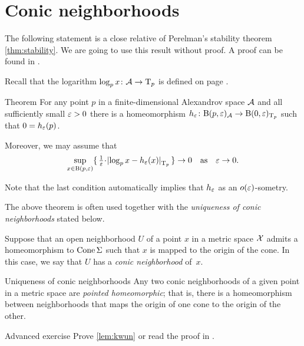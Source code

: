 \section{Conic neighborhoods}

The following statement is a close relative of Perelman's stability theorem \ref{thm:stability}.
We are going to use this result without proof.
A proof can be found in \cite{perelman1993}.

Recall that the logarithm $\log_px\colon\mathcal{A}\to \mathrm{T}_p$ is defined on page \pageref{page:log}.

\begin{thm}{Theorem}\label{thm:spherical-nbhd}
For any point $p$ in a finite-dimensional Alexandrov space $\mathcal{A}$
and all sufficiently small $\varepsilon>0$
there is a homeomorphism $h_\varepsilon\colon\mathrm{B}{}(p,\varepsilon)_{\mathcal{A}}\to \mathrm{B}{}(0,\varepsilon)_{\mathrm{T}_p}$ such that $0=h_\varepsilon(p)$.

Moreover, we may assume that
\[
\sup_{x\in \oBall(p,\eps)}\{\,\tfrac1\eps\cdot\dist{\log_px}{h_\eps(x)}{\T_p}\,\}\to 0
\quad\text{as}\quad
\eps\to 0.\]
\end{thm}

Note that the last condition automatically implies that $h_\varepsilon$ as an $o(\varepsilon)$-sometry.

The above theorem is often used together with the \textit{uniqueness of conic neighborhoods} stated below.

Suppose that an open  neighborhood $U$ of a point $x$ in a metric space $\mathcal{X}$
admits a homeomorphism to $\mathop{\rm Cone}\nolimits\Sigma$ such that $x$ is mapped to the origin of the cone.
In this case, we say that $U$ has a \emph{conic neighborhood} of~$x$.

\begin{thm}{Uniqueness of conic neighborhoods}\label{lem:kwun}
Any two conic neighborhoods of a given point in a metric space are \emph{pointed homeomorphic}; that is, there is a homeomorphism between neighborhoods that maps the origin of one cone to the origin of the other.
\end{thm}

\begin{thm}{Advanced exercise}\label{ex:conic}
Prove \ref{lem:kwun} or read the proof in \cite{kwun1964}.
\end{thm}


